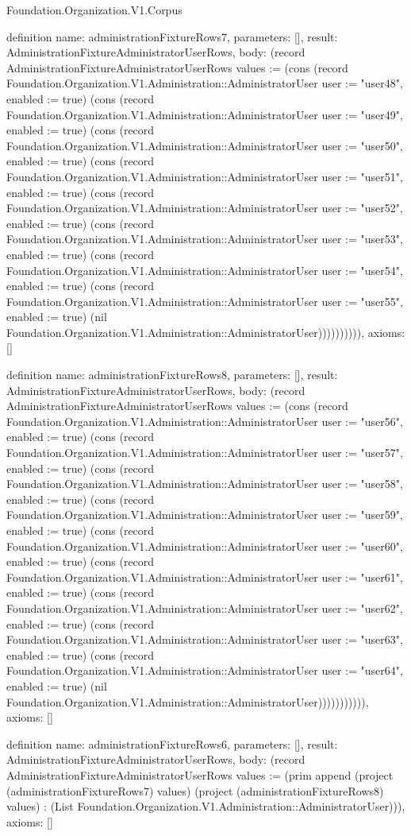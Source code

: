 \begin{lexlean}{Foundation.Organization.V1.Corpus}
\begin{semanticmodule}
definition{
  name: administrationFixtureRows7,
  parameters: [],
  result: AdministrationFixtureAdministratorUserRows,
  body: (record AdministrationFixtureAdministratorUserRows {values := (cons (record Foundation.Organization.V1.Administration::AdministratorUser {user := "user48", enabled := true}) (cons (record Foundation.Organization.V1.Administration::AdministratorUser {user := "user49", enabled := true}) (cons (record Foundation.Organization.V1.Administration::AdministratorUser {user := "user50", enabled := true}) (cons (record Foundation.Organization.V1.Administration::AdministratorUser {user := "user51", enabled := true}) (cons (record Foundation.Organization.V1.Administration::AdministratorUser {user := "user52", enabled := true}) (cons (record Foundation.Organization.V1.Administration::AdministratorUser {user := "user53", enabled := true}) (cons (record Foundation.Organization.V1.Administration::AdministratorUser {user := "user54", enabled := true}) (cons (record Foundation.Organization.V1.Administration::AdministratorUser {user := "user55", enabled := true}) (nil Foundation.Organization.V1.Administration::AdministratorUser)))))))))}),
  axioms: []
}

definition{
  name: administrationFixtureRows8,
  parameters: [],
  result: AdministrationFixtureAdministratorUserRows,
  body: (record AdministrationFixtureAdministratorUserRows {values := (cons (record Foundation.Organization.V1.Administration::AdministratorUser {user := "user56", enabled := true}) (cons (record Foundation.Organization.V1.Administration::AdministratorUser {user := "user57", enabled := true}) (cons (record Foundation.Organization.V1.Administration::AdministratorUser {user := "user58", enabled := true}) (cons (record Foundation.Organization.V1.Administration::AdministratorUser {user := "user59", enabled := true}) (cons (record Foundation.Organization.V1.Administration::AdministratorUser {user := "user60", enabled := true}) (cons (record Foundation.Organization.V1.Administration::AdministratorUser {user := "user61", enabled := true}) (cons (record Foundation.Organization.V1.Administration::AdministratorUser {user := "user62", enabled := true}) (cons (record Foundation.Organization.V1.Administration::AdministratorUser {user := "user63", enabled := true}) (cons (record Foundation.Organization.V1.Administration::AdministratorUser {user := "user64", enabled := true}) (nil Foundation.Organization.V1.Administration::AdministratorUser))))))))))}),
  axioms: []
}

definition{
  name: administrationFixtureRows6,
  parameters: [],
  result: AdministrationFixtureAdministratorUserRows,
  body: (record AdministrationFixtureAdministratorUserRows {values := (prim append (project (administrationFixtureRows7) values) (project (administrationFixtureRows8) values) : (List Foundation.Organization.V1.Administration::AdministratorUser))}),
  axioms: []
}


\end{semanticmodule}
\end{lexlean}
